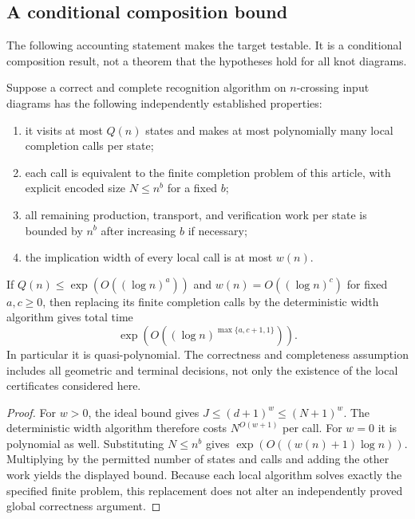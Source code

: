 \subsection{A conditional composition bound}

The following accounting statement makes the target testable.  It is a
conditional composition result, not a theorem that the hypotheses hold
for all knot diagrams.

\begin{proposition}
\label{prop:global-conditional}
Suppose a correct and complete recognition algorithm on $n$-crossing input
diagrams has the following independently established properties:
\begin{enumerate}
\item it visits at most $Q(n)$ states and makes at most polynomially many
  local completion calls per state;
\item each call is equivalent to the finite completion problem of this
  article, with explicit encoded size $N\leq n^b$ for a fixed $b$;
\item all remaining production, transport, and verification work per state
  is bounded by $n^b$ after increasing $b$ if necessary;
\item the implication width of every local call is at most $w(n)$.
\end{enumerate}
If $Q(n)\leq\exp(O((\log n)^a))$ and
$w(n)=O((\log n)^c)$ for fixed $a,c\geq0$, then replacing its finite
completion calls by the deterministic width algorithm gives total time
\[
       \exp\!\left(O\left((\log n)^{\max\{a,c+1,1\}}\right)\right).
\]
In particular it is quasi-polynomial.  The correctness and completeness
assumption includes all geometric and terminal decisions, not only the
existence of the local certificates considered here.
\end{proposition}
\begin{proof}
For $w>0$, the ideal bound gives $J\leq(d+1)^w\leq(N+1)^w$.
The deterministic width algorithm therefore costs $N^{O(w+1)}$ per call.
For $w=0$ it is polynomial as well.  Substituting $N\leq n^b$ gives
\(\exp(O((w(n)+1)\log n))\).  Multiplying by the permitted number of
states and calls and adding the other work yields the displayed bound.
Because each local algorithm solves exactly the specified finite problem,
this replacement does not alter an independently proved global correctness
argument.
\end{proof}

